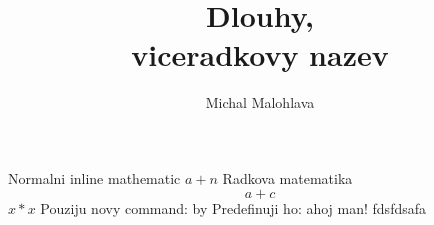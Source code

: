 \documentclass[czech,12pt]{article}
\title{Dlouhy,\\viceradkovy nazev}
\author{Michal Malohlava}
\newcommand{\old}{by}
\begin{document}
Normalni inline mathematic
\(
a+n
\)
Radkova matematika
\[
a+c
\]
\begin{math}
x*x
\end{math}
Pouziju novy command: \old
Predefinuji ho:
\renewcommand{\old}[1]{ahoj #1!}
\old{man}
	fdsfdsafa
\end{document}
